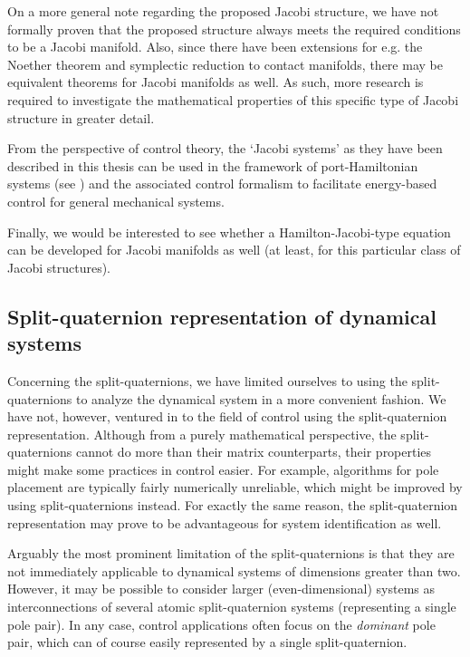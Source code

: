 On a more general note regarding the proposed Jacobi structure, we have not formally proven that the proposed structure always meets the required conditions to be a Jacobi manifold. Also, since there have been extensions for e.g. the Noether theorem and symplectic reduction to contact manifolds, there may be equivalent theorems for Jacobi manifolds as well. As such, more research is required to investigate the mathematical properties of this specific type of Jacobi structure in greater detail.

From the perspective of control theory, the `Jacobi systems' as they have been described in this thesis can be used in the framework of port-Hamiltonian systems (see \citet{VanDerSchaft2006}) and the associated control formalism to facilitate energy-based control for general mechanical systems.

Finally, we would be interested to see whether a Hamilton-Jacobi-type equation can be developed for Jacobi manifolds as well (at least, for this particular class of Jacobi structures).

\subsection*{Split-quaternion representation of dynamical systems}
Concerning the split-quaternions, we have limited ourselves to using the split-quaternions to analyze the dynamical system in a more convenient fashion. We have not, however, ventured in to the field of control using the split-quaternion representation. Although from a purely mathematical perspective, the split-quaternions cannot do more than their matrix counterparts, their properties might make some practices in control easier. For example, algorithms for pole placement are typically fairly numerically unreliable, which might be improved by using split-quaternions instead. For exactly the same reason, the split-quaternion representation may prove to be advantageous for system identification as well.

Arguably the most prominent limitation of the split-quaternions is that they are not immediately applicable to dynamical systems of dimensions greater than two. However, it may be possible to consider larger (even-dimensional) systems as interconnections of several atomic split-quaternion systems (representing a single pole pair). In any case, control applications often focus on the \emph{dominant} pole pair, which can of course easily represented by a single split-quaternion.

